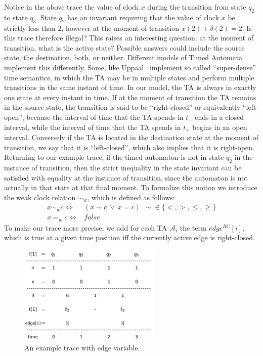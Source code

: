 \documentclass[a4paper,11pt]{report}
\theoremstyle{definition}
\begin{document}
Notice in the above trace the value of clock $x$ during the transition from
state $q_{2}$ to state $q_{3}$. State $q_{2}$ has an invariant requiring that
the value of clock $x$ be strictly less than $2$, however at the moment of
transition $x(2) + \delta(2) = 2$. Is this trace therefore illegal? This raises
an interesting question: at the moment of transition, what is the active state?
Possible answers could include the source state, the destination, both, or
neither. Different models of Timed Automata implement this differently. Some,
like Uppaal~\cite{larsen97} implement so called ``super-dense'' time semantics,
in which the TA may be in multiple states and perform multiple transitions in
the same instant of time. In our model, the TA is always in exactly one state at
every instant in time. If at the moment of transition the TA remains in the
source state, the transition is said to be ``right-closed'' or equivalently
``left-open'', because the interval of time that the TA spends in \(t_{-}\) ends
in a closed interval, while the interval of time that the TA spends in \(t_{+}\)
begins in an open interval. Conversely if the TA is located in the destination
state at the moment of transition, we say that it is ``left-closed'', which also
implies that it is right-open. Returning to our example trace, if the timed
automaton is not in state $q_{2}$ in the instance of transition, then the strict
inequality in the state invariant can be satisfied with equality at the instance
of transition, since the automaton is not actually in that state at that final
moment. To formalize this notion we introduce the weak clock relation
$\sim_{w}$, which is defined as follows:
\begin{align*}
  x \sim_{w} c  \iff & (x \sim c\ \lor\ x = c) \ \ \sim \in \{<,>,\leq,\geq\} \\
  x =_{w} c  \iff & false
\end{align*}
To make our trace more precise, we add for each TA $\mathcal{A}_{i}$ the term
$edge^{RC}[i]$, which is true at a given time position iff the currently active
edge is right-closed.

\begin{figure}[h]
  \centering
  \includegraphics[width=0.6\textwidth]{trace-shift-full}
  \caption{An example trace with edge variable.}
  \label{fig:trace-full}
\end{figure}
\end{document}
